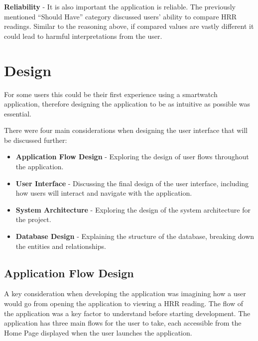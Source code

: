 \documentclass{l4proj}
\begin{document}
\textbf{Reliability} - It is also important the application is reliable. The previously mentioned “Should Have” category discussed users' ability to compare HRR readings. Similar to the reasoning above, if compared values are vastly different it could lead to harmful interpretations from the user.

\chapter{Design}
\label{sec:design}

For some users this could be their first experience using a smartwatch application, therefore designing the application to be as intuitive as possible was essential. 

There were four main considerations when designing the user interface that will be discussed further:

\begin{itemize}
    \item \textbf{Application Flow Design} - Exploring the design of user flows throughout the application.
    \item \textbf{User Interface} - Discussing the final design of the user interface, including how users will interact and navigate with the application.
    \item \textbf{System Architecture} - Exploring the design of the system architecture for the project.
    \item \textbf{Database Design} - Explaining the structure of the database, breaking down the entities and relationships.
\end{itemize}

\section{Application Flow Design}
\label{sec:appflow}

A key consideration when developing the application was imagining how a user would go from opening the application to viewing a HRR reading. The flow of the application was a key factor to understand before starting development. The application has three main flows for the user to take, each accessible from the Home Page displayed when the user launches the application.
\end{document}
